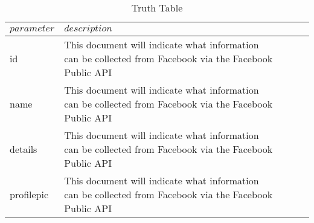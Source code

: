 \documentclass{article}
\begin{document}
	\begin{table}[H]
	\centering
	\caption{Truth Table}
	\label{my-label}
	\begin{tabular}{|l|l|l|l|l|}
	\hline
	$parameter$ & $description$ 	\\ \hline
	id 				& This document will indicate what information can be collected from Facebook via the Facebook Public API \\
	name 			& This document will indicate what information can be collected from Facebook via the Facebook Public API \\
	details 		& This document will indicate what information can be collected from Facebook via the Facebook Public API	\\
	profilepic 		& This document will indicate what information can be collected from Facebook via the Facebook Public API \\   \hline
	\end{tabular}
	\end{table}
		
	
\end{document}
